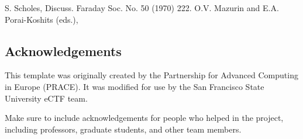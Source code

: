 \documentclass{prace}
\begin{document}
%
\begin{thebibliography}{99}
	S. Scholes, Discuss. Faraday Soc. No. 50 (1970) 222.
	O.V. Mazurin and E.A. Porai-Koshits (eds.),
\end{thebibliography}

\subsection*{Acknowledgements}
This template was originally created by the Partnership for Advanced Computing
in Europe (PRACE). It was modified for use by the San Francisco State University
eCTF team.

Make sure to include acknowledgements for people who helped in the project,
including professors, graduate students, and other team members.

\end{document}
